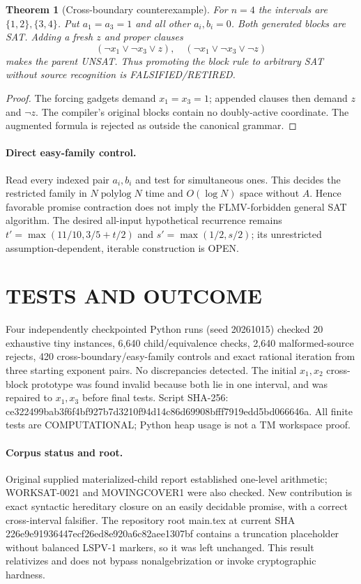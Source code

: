 \documentclass{article}
\newtheorem{theorem}{Theorem}
\begin{document}
\begin{theorem}[Cross-boundary counterexample]
For $n=4$ the intervals are $\{1,2\},\{3,4\}$. Put $a_1=a_3=1$ and all other $a_i,b_i=0$. Both generated blocks are SAT. Adding a fresh $z$ and proper clauses
\[
(\neg x_1\vee\neg x_3\vee z),\quad
(\neg x_1\vee\neg x_3\vee\neg z)
\]
makes the parent UNSAT. Thus promoting the block rule to arbitrary SAT without source recognition is FALSIFIED/RETIRED.
\end{theorem}
\begin{proof}
The forcing gadgets demand $x_1=x_3=1$; appended clauses then demand $z$ and $\neg z$. The compiler's original blocks contain no doubly-active coordinate. The augmented formula is rejected as outside the canonical grammar.
\end{proof}
\paragraph{Direct easy-family control.} Read every indexed pair $a_i,b_i$ and test for simultaneous ones. This decides the restricted family in $N\operatorname{polylog}N$ time and $O(\log N)$ space without $A$. Hence favorable promise contraction does not imply the FLMV-forbidden general SAT algorithm. The desired all-input hypothetical recurrence remains $t'=\max(11/10,3/5+t/2)$ and $s'=\max(1/2,s/2)$; its unrestricted assumption-dependent, iterable construction is OPEN.
\section{TESTS AND OUTCOME}
Four independently checkpointed Python runs (seed 20261015) checked 20 exhaustive tiny instances, 6,640 child/equivalence checks, 2,640 malformed-source rejects, 420 cross-boundary/easy-family controls and exact rational iteration from three starting exponent pairs. No discrepancies detected. The initial $x_1,x_2$ cross-block prototype was found invalid because both lie in one interval, and was repaired to $x_1,x_3$ before final tests. Script SHA-256: ce322499bab3f6f4bf927b7d3210f94d14c86d69908bfff7919edd5bd066646a. All finite tests are COMPUTATIONAL; Python heap usage is not a TM workspace proof.
\paragraph{Corpus status and root.} Original supplied materialized-child report established one-level arithmetic; WORKSAT-0021 and MOVINGCOVER1 were also checked. New contribution is exact syntactic hereditary closure on an easily decidable promise, with a correct cross-interval falsifier. The repository root main.tex at current SHA 226e9e91936447ecf26ed8e920a6c82aee1307bf contains a truncation placeholder without balanced LSPV-1 markers, so it was left unchanged. This result relativizes and does not bypass nonalgebrization or invoke cryptographic hardness.
\end{document}
